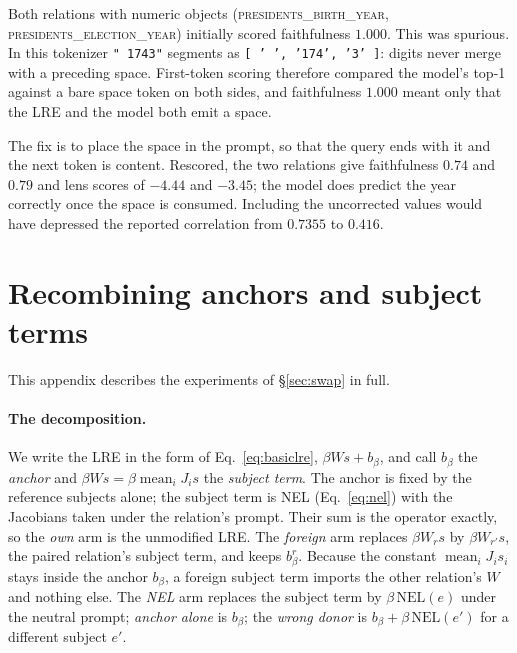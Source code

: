 \documentclass{article}
\def\headlinenumber{0.7355}
\begin{document}
Both relations with numeric objects
(\textsc{presidents\_birth\_year}, \textsc{presidents\_election\_year})
initially scored faithfulness $1.000$. This was spurious. In this
tokenizer \texttt{" 1743"} segments as \texttt{[\,' ', '174', '3'\,]}:
digits never merge with a preceding space. First-token scoring therefore
compared the model's top-1 against a bare space token on both sides, and
faithfulness $1.000$ meant only that the LRE and the model both emit a
space.

The fix is to place the space in the prompt, so that the query ends with
it and the next token is content. Rescored, the two relations give
faithfulness $0.74$ and $0.79$ and lens scores of $-4.44$ and $-3.45$; the model does
predict the year correctly once the space is consumed. Including the
uncorrected values would have depressed the reported correlation from
$\headlinenumber$ to $0.416$.

\section{Recombining anchors and subject terms}
\label{sec:swapdetail}

This appendix describes the experiments of \S\ref{sec:swap} in full.

\paragraph{The decomposition.} We write the LRE in the form of
Eq.~\ref{eq:basiclre}, $\beta W s + b_\beta$, and call $b_\beta$ the
\emph{anchor} and $\beta W s = \beta \operatorname{mean}_i J_i s$ the
\emph{subject term}. The anchor is fixed by the reference subjects
alone; the subject term is NEL (Eq.~\ref{eq:nel}) with the Jacobians
taken under the relation's prompt. Their sum is the operator exactly, so
the \emph{own} arm is the unmodified LRE. The \emph{foreign} arm replaces
$\beta W_r s$ by $\beta W_{r'} s$, the paired relation's subject term,
and keeps $b_\beta^r$. Because the constant
$\operatorname{mean}_i J_i s_i$ stays inside the anchor $b_\beta$, a
foreign subject term imports the other relation's $W$ and nothing else.
The \emph{NEL} arm replaces the subject term by $\beta\,\mbox{NEL}(e)$
under the neutral prompt; \emph{anchor alone} is $b_\beta$; the
\emph{wrong donor} is $b_\beta + \beta\,\mbox{NEL}(e')$ for a different
subject $e'$.
\end{document}
